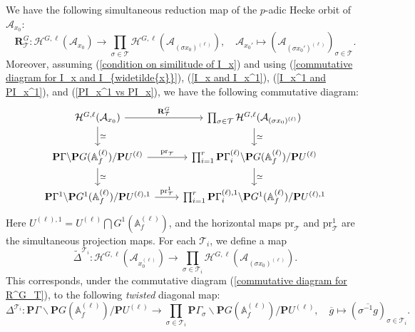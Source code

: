 \documentclass[11pt,oneside,reqno]{amsart}
\newcommand{\pr}{\mathrm{pr}}
\newcommand{\A}{\mathbb{A}}
\newcommand{\Acal}{\mathcal{A}}
\newcommand{\Hcal}{\mathcal{H}}
\newcommand{\Tcal}{\mathcal{T}}
\newcommand{\Pbf}{\mathbf{P}}
\newcommand{\Rbf}{\mathbf{R}}
\theoremstyle{plain}
\begin{document}
	
	We have the following simultaneous reduction map of the $p$-adic Hecke orbit of $\Acal_{x_0}$:
	\[
	\Rbf_{\Tcal}^G
	\colon
	\Hcal^{G,\ell}(\Acal_{x_0})
	\to
	\prod_{\sigma\in\Tcal}\Hcal^{G,\ell}(\Acal_{(\sigma x_0)^{(\ell)}}),
	\quad
	\Acal_{x_0'}
	\mapsto
	(\Acal_{(\sigma x_0')^{(\ell)}})_{\sigma\in\Tcal}.
	\]
	Moreover, assuming (\ref{condition on similitude of I_x}) and using (\ref{commutative diagram for I_x and I_{widetilde{x}}}), (\ref{I_x and I_x^1}), (\ref{I_x^1 and PI_x^1}), and (\ref{PI_x^1 vs PI_x}), we have the following commutative diagram:
	\begin{equation}\label{commutative diagram for R^G_T}
		\begin{tikzcd}
			\Hcal^{G,\ell}(\Acal_{x_0})
			\arrow[r,"\Rbf^G_{\Tcal}"]
			\arrow[d,"\simeq"]
			&
			\prod_{\sigma\in\Tcal}
			\Hcal^{G,\ell}(\Acal_{(\sigma x_0)^{(\ell)}})
			\arrow[d,"\simeq"]
			\\
			\Pbf\Gamma
			\backslash \Pbf G(\A_f^{(\ell)})/\Pbf U^{(\ell)}
			\arrow[r,"\pr_\Tcal"]
			\arrow[d,"\simeq"]
			&
			\prod_{i=1}^r
			\Pbf\Gamma_i^{(\ell)}
			\backslash \Pbf G(\A_f^{(\ell)})/\Pbf U^{(\ell)}
			\arrow[d,"\simeq"]
			\\
			\Pbf\Gamma^1
			\backslash \Pbf G^1(\A_f^{(\ell)})/\Pbf U^{(\ell),1}
			\arrow[r,"\pr_\Tcal^1"]
			&
			\prod_{i=1}^r
			\Pbf\Gamma^{(\ell),1}_i
			\backslash \Pbf G^1(\A_f^{(\ell)})/\Pbf U^{(\ell),1}
		\end{tikzcd}
	\end{equation}
	Here $U^{(\ell),1}=U^{(\ell)}\bigcap G^1(\A_f^{(\ell)})$, and the horizontal maps $\pr_\Tcal$ and $\pr_\Tcal^1$ are the simultaneous projection maps.
	For each $\Tcal_i$, we define a map
	\[
	\widetilde{\Delta}^{\Tcal_i}
	\colon
	\Hcal^{G,\ell}(\Acal_{x_0^{(\ell)}})
	\to
	\prod_{\sigma\in\Tcal_i}
	\Hcal^{G,\ell}(\Acal_{(\sigma x_0)^{(\ell)}}).
	\]
	This corresponds, under the commutative diagram (\ref{commutative diagram for R^G_T}), to the following \emph{twisted} diagonal map:
	\[
	\Delta^{\Tcal_i}\colon
	\Pbf\Gamma\backslash \Pbf G(\A_f^{(\ell)})/\Pbf U^{(\ell)}
	\to
	\prod_{\sigma\in\Tcal_i}
	\Pbf\Gamma_\sigma\backslash \Pbf G(\A_f^{(\ell)})/\Pbf U^{(\ell)},
	\quad
	\overline{g}\mapsto
	(\overline{\sigma^{-1}g})_{\sigma\in\Tcal_i}.
	\]
	
	
	
	
	
	
	
	
	
\end{document}
